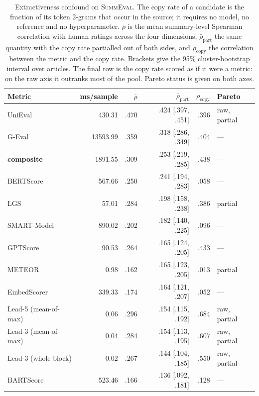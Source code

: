 \begin{table}[t]
\centering
\caption{Extractiveness confound on \textsc{SummEval}. The copy rate of a candidate is the fraction of its token 2-grams that occur in the source; it requires no model, no reference and no hyperparameter. $\bar{\rho}$ is the mean summary-level Spearman correlation with human ratings across the four dimensions, $\bar{\rho}_{\mathrm{part}}$ the same quantity with the copy rate partialled out of both sides, and $\rho_{\mathrm{copy}}$ the correlation between the metric and the copy rate. Brackets give the 95\% cluster-bootstrap interval over articles. The final row is the copy rate scored as if it were a metric: on the raw axis it outranks most of the pool. Pareto status is given on both axes.}
\label{tab:confound}
\small
\linespread{1}\selectfont
\setlength{\tabcolsep}{4pt}
\begin{tabular}{@{}lrrrrl@{}}
\toprule
Metric & ms/sample & $\bar{\rho}$ & $\bar{\rho}_{\mathrm{part}}$ & $\rho_{\mathrm{copy}}$ & Pareto \\
\midrule
UniEval & 430.31 & .470 & .424 {\scriptsize [.397, .451]} & .396 & raw, partial \\
G-Eval & 13593.99 & .359 & .318 {\scriptsize [.286, .349]} & .404 & --- \\
\textbf{composite} & 1891.55 & .309 & .253 {\scriptsize [.219, .285]} & .438 & --- \\
BERTScore & 567.66 & .250 & .241 {\scriptsize [.194, .283]} & .058 & --- \\
LGS & 57.01 & .284 & .198 {\scriptsize [.158, .238]} & .386 & partial \\
SMART-Model & 890.02 & .202 & .182 {\scriptsize [.140, .225]} & .096 & --- \\
GPTScore & 90.53 & .264 & .165 {\scriptsize [.124, .205]} & .433 & --- \\
METEOR & 0.98 & .162 & .165 {\scriptsize [.123, .205]} & .013 & partial \\
EmbedScorer & 339.33 & .174 & .164 {\scriptsize [.121, .207]} & .052 & --- \\
Lead-5 (mean-of-max) & 0.06 & .296 & .154 {\scriptsize [.115, .192]} & .684 & raw, partial \\
Lead-3 (mean-of-max) & 0.04 & .284 & .154 {\scriptsize [.113, .195]} & .607 & raw, partial \\
Lead-3 (whole block) & 0.02 & .267 & .144 {\scriptsize [.104, .185]} & .550 & raw, partial \\
BARTScore & 523.46 & .166 & .136 {\scriptsize [.092, .181]} & .128 & --- \\

\end{tabular}
\end{table}
